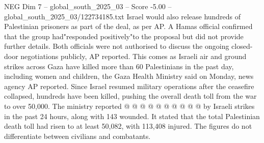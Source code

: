 \begin{textsample}{NEG Dim 7 – global\_south\_2025\_03 – Score -5.00 – global\_south\_2025\_03/122734185.txt}
Israel would also release hundreds of Palestinian prisoners as part of the deal, as per AP.
A Hamas official confirmed that the group had"responded positively"to the proposal but did not provide further details.
Both officials were not authorised to discuss the ongoing closed-door negotiations publicly, AP reported.
This comes as Israeli air and ground strikes across Gaza have killed more than 60 Palestinians in the past day, including women and children, the Gaza Health Ministry said on Monday, news agency AP reported.
Since Israel resumed military operations after the ceasefire collapsed, hundreds have been killed, pushing the overall death toll from the war to over 50,000.
The ministry reported @ @ @ @ @ @ @ @ @ @ by Israeli strikes in the past 24 hours, along with 143 wounded.
It stated that the total Palestinian death toll had risen to at least 50,082, with 113,408 injured.
The figures do not differentiate between civilians and combatants.

\end{textsample}

